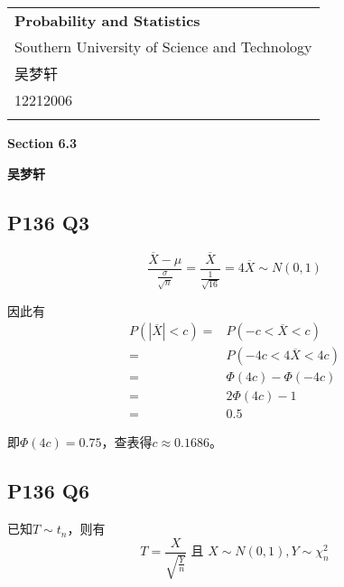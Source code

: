 \documentclass[a4paper,12pt]{ctexart}
\begin{document}
\thispagestyle{empty} %

\begin{tabular}{p{15.5cm}}
{\large \bf Probability and Statistics} \\
Southern University of Science and Technology \\ 吴梦轩 \\ 12212006 \\
\hline
\\
\end{tabular}

\vspace*{0.3cm} %

\begin{center}
	{\Large \bf Section 6.3}
	\vspace{2mm}

	{\bf 吴梦轩}
		
\end{center}  

\vspace{0.4cm}

\subsection*{P136 Q3}

\begin{equation*}
	\frac{\overline{X} - \mu}{\frac{\sigma}{\sqrt{n}}} = \frac{\overline{X}}{\frac{1}{\sqrt{16}}} = 4\overline{X} \sim N(0, 1)
\end{equation*}

因此有
\begin{align*}
	P(|\overline{X}| < c) =& P(-c < \overline{X} < c) \\
	=& P(-4c < 4\overline{X} < 4c) \\
	=& \Phi(4c) - \Phi(-4c) \\
	=& 2\Phi(4c) - 1 \\
	=& 0.5
\end{align*}

即$\Phi(4c) = 0.75$，查表得$c \approx 0.1686$。

\subsection*{P136 Q6}

已知$T \sim t_n$，则有
\begin{equation*}
	T = \frac{X}{\sqrt{\frac{Y}{n}}} \text{ 且 } X \sim N(0, 1), Y \sim \chi^2_n
\end{equation*}
\end{document}
